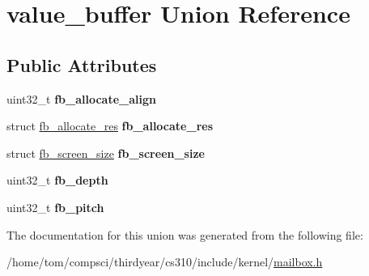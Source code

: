 \hypertarget{unionvalue__buffer}{}\section{value\+\_\+buffer Union Reference}
\label{unionvalue__buffer}
\subsection*{Public Attributes}
\begin{DoxyCompactItemize}
\item 
\mbox{\label{unionvalue__buffer_aa6f785f57807bc7d3900c5c44c4b7e6c}} 
uint32\+\_\+t {\bfseries fb\+\_\+allocate\+\_\+align}
\item 
\mbox{\label{unionvalue__buffer_a700a703da53a1d25c52806dfddb76947}} 
struct \mbox{\hyperlink{structfb__allocate__res}{fb\+\_\+allocate\+\_\+res}} {\bfseries fb\+\_\+allocate\+\_\+res}
\item 
\mbox{\label{unionvalue__buffer_a3714cc1e27afea6589cedf30895c10b8}} 
struct \mbox{\hyperlink{structfb__screen__size}{fb\+\_\+screen\+\_\+size}} {\bfseries fb\+\_\+screen\+\_\+size}
\item 
\mbox{\label{unionvalue__buffer_a792ebf2d5bbf10c997a35af21736ac32}} 
uint32\+\_\+t {\bfseries fb\+\_\+depth}
\item 
\mbox{\label{unionvalue__buffer_a92d54ef58c36f78a05fa9d6c1f0802ea}} 
uint32\+\_\+t {\bfseries fb\+\_\+pitch}
\end{DoxyCompactItemize}


The documentation for this union was generated from the following file\+:\begin{DoxyCompactItemize}
\item 
/home/tom/compsci/thirdyear/cs310/include/kernel/\mbox{\hyperlink{mailbox_8h}{mailbox.\+h}}\end{DoxyCompactItemize}
